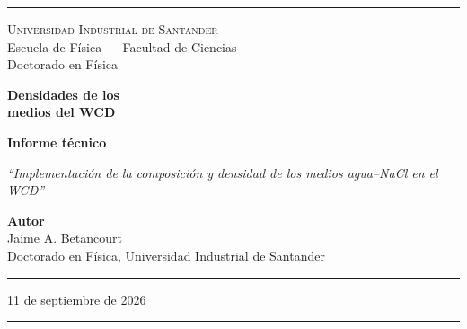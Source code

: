 \documentclass[11pt,a4paper]{article}
\newcommand{\codigo}[1]{\texttt{#1}}
\begin{document}
\pagestyle{empty}


\begin{titlepage}
\begin{center}

\vspace*{0.5cm}
\textcolor{reglaColor}{\rule{\linewidth}{1.2pt}}

\vspace{1.3cm}
{\Large\scshape Universidad Industrial de Santander}\\[0.2cm]
{\large Escuela de Física --- Facultad de Ciencias}\\[0.2cm]
{\large Doctorado en Física}

\vspace{2.2cm}
{\Huge\bfseries\color{tituloColor} Densidades de los\\[0.2cm]
medios del WCD}

\vspace{1.8cm}
{\large\textbf{Informe técnico}}

\vspace{0.6cm}
\begin{minipage}{0.82\linewidth}
\centering
\textit{``Implementación de la composición y densidad de los medios agua--NaCl en el WCD''}
\end{minipage}

\vfill

{\large\textbf{Autor}}\\[0.15cm]
Jaime A. Betancourt\\[0.1cm]
Doctorado en Física, Universidad Industrial de Santander

\vspace{1.2cm}
\textcolor{reglaColor}{\rule{0.5\linewidth}{0.6pt}}

\vspace{1cm}
11 de septiembre de 2026

\vspace{1cm}
\textcolor{reglaColor}{\rule{\linewidth}{1.2pt}}

\end{center}
\end{titlepage}

\pagestyle{plain}

\begin{abstract}
Se documentan las modificaciones propuestas para \codigo{Materials.cc} y
\codigo{SaltyWCD.cc} con el fin de representar, a $20\,^{\circ}\mathrm{C}$,
agua pura y soluciones acuosas con 2.5, 5.0 y 10.0\,\% de NaCl en fracción
másica final. Cada medio recibe su densidad indicada, la composición elemental
se calcula con la misma convención y la geometría selecciona el material
correspondiente. No se modifican la geometría, los modelos físicos de Geant4
ni las propiedades ópticas existentes.
\end{abstract}
\end{document}
